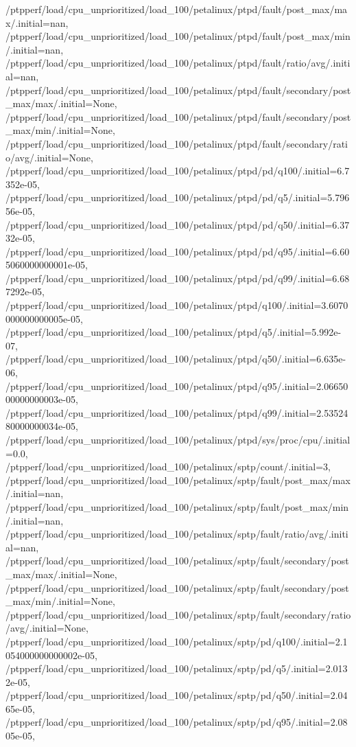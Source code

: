 {    /ptpperf/load/cpu_unprioritized/load_100/petalinux/ptpd/fault/post_max/max/.initial=nan,
    /ptpperf/load/cpu_unprioritized/load_100/petalinux/ptpd/fault/post_max/min/.initial=nan,
    /ptpperf/load/cpu_unprioritized/load_100/petalinux/ptpd/fault/ratio/avg/.initial=nan,
    /ptpperf/load/cpu_unprioritized/load_100/petalinux/ptpd/fault/secondary/post_max/max/.initial=None,
    /ptpperf/load/cpu_unprioritized/load_100/petalinux/ptpd/fault/secondary/post_max/min/.initial=None,
    /ptpperf/load/cpu_unprioritized/load_100/petalinux/ptpd/fault/secondary/ratio/avg/.initial=None,
    /ptpperf/load/cpu_unprioritized/load_100/petalinux/ptpd/pd/q100/.initial=6.7352e-05,
    /ptpperf/load/cpu_unprioritized/load_100/petalinux/ptpd/pd/q5/.initial=5.79656e-05,
    /ptpperf/load/cpu_unprioritized/load_100/petalinux/ptpd/pd/q50/.initial=6.3732e-05,
    /ptpperf/load/cpu_unprioritized/load_100/petalinux/ptpd/pd/q95/.initial=6.605060000000001e-05,
    /ptpperf/load/cpu_unprioritized/load_100/petalinux/ptpd/pd/q99/.initial=6.687292e-05,
    /ptpperf/load/cpu_unprioritized/load_100/petalinux/ptpd/q100/.initial=3.6070000000000005e-05,
    /ptpperf/load/cpu_unprioritized/load_100/petalinux/ptpd/q5/.initial=5.992e-07,
    /ptpperf/load/cpu_unprioritized/load_100/petalinux/ptpd/q50/.initial=6.635e-06,
    /ptpperf/load/cpu_unprioritized/load_100/petalinux/ptpd/q95/.initial=2.0665000000000003e-05,
    /ptpperf/load/cpu_unprioritized/load_100/petalinux/ptpd/q99/.initial=2.5352480000000034e-05,
    /ptpperf/load/cpu_unprioritized/load_100/petalinux/ptpd/sys/proc/cpu/.initial=0.0,
    /ptpperf/load/cpu_unprioritized/load_100/petalinux/sptp/count/.initial=3,
    /ptpperf/load/cpu_unprioritized/load_100/petalinux/sptp/fault/post_max/max/.initial=nan,
    /ptpperf/load/cpu_unprioritized/load_100/petalinux/sptp/fault/post_max/min/.initial=nan,
    /ptpperf/load/cpu_unprioritized/load_100/petalinux/sptp/fault/ratio/avg/.initial=nan,
    /ptpperf/load/cpu_unprioritized/load_100/petalinux/sptp/fault/secondary/post_max/max/.initial=None,
    /ptpperf/load/cpu_unprioritized/load_100/petalinux/sptp/fault/secondary/post_max/min/.initial=None,
    /ptpperf/load/cpu_unprioritized/load_100/petalinux/sptp/fault/secondary/ratio/avg/.initial=None,
    /ptpperf/load/cpu_unprioritized/load_100/petalinux/sptp/pd/q100/.initial=2.1054000000000002e-05,
    /ptpperf/load/cpu_unprioritized/load_100/petalinux/sptp/pd/q5/.initial=2.0132e-05,
    /ptpperf/load/cpu_unprioritized/load_100/petalinux/sptp/pd/q50/.initial=2.0465e-05,
    /ptpperf/load/cpu_unprioritized/load_100/petalinux/sptp/pd/q95/.initial=2.0805e-05,
}
